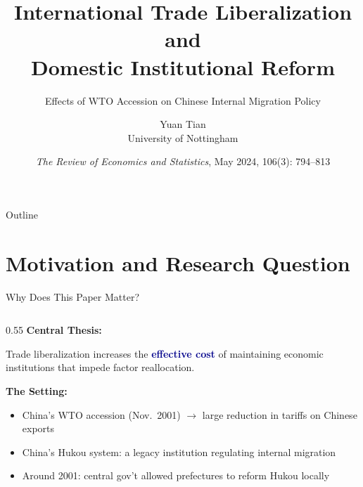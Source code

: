 \documentclass[10pt,aspectratio=169,t]{beamer}
\title[Tian (2024, REStat)]{International Trade Liberalization and\\Domestic Institutional Reform}
\subtitle{Effects of WTO Accession on Chinese Internal Migration Policy}
\author[Yuan Tian]{Yuan Tian\\{\small University of Nottingham}}
\date{\textit{The Review of Economics and Statistics}, May 2024, 106(3): 794--813}
\institute[Presented by Christopher]{Presented by Christopher}
\newcommand{\hlight}[1]{\textcolor{darkblue}{\textbf{#1}}}
\begin{document}
\begin{frame}[plain]
\titlepage
\end{frame}

\begin{frame}{Outline}
\tableofcontents
\end{frame}

\section{Motivation and Research Question}

\begin{frame}{Why Does This Paper Matter?}
\begin{columns}[T]
\begin{column}{0.55\textwidth}
\textbf{Central Thesis:}
\medskip

Trade liberalization increases the \hlight{effective cost} of maintaining economic institutions that impede factor reallocation.

\bigskip
\textbf{The Setting:}
\begin{itemize}
    \item China's WTO accession (Nov.\ 2001) $\rightarrow$ large reduction in tariffs on Chinese exports
    \item China's Hukou system: a legacy institution regulating internal migration
    \item Around 2001: central gov't allowed prefectures to reform Hukou locally
\end{itemize}


\end{column}
\end{columns}
\end{frame}
\end{document}

